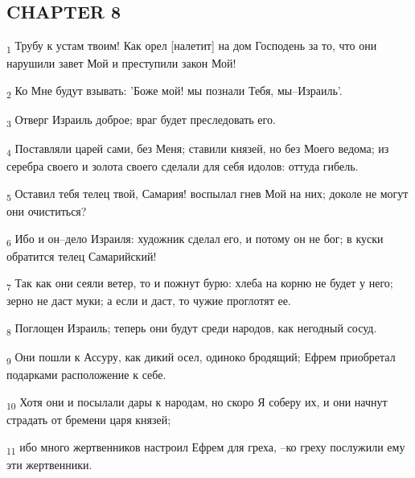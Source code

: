 \subsection{CHAPTER 8}
\begin{tcolorbox}
\textsubscript{1} Трубу к устам твоим! Как орел [налетит] на дом Господень за то, что они нарушили завет Мой и преступили закон Мой!
\end{tcolorbox}
\begin{tcolorbox}
\textsubscript{2} Ко Мне будут взывать: 'Боже мой! мы познали Тебя, мы--Израиль'.
\end{tcolorbox}
\begin{tcolorbox}
\textsubscript{3} Отверг Израиль доброе; враг будет преследовать его.
\end{tcolorbox}
\begin{tcolorbox}
\textsubscript{4} Поставляли царей сами, без Меня; ставили князей, но без Моего ведома; из серебра своего и золота своего сделали для себя идолов: оттуда гибель.
\end{tcolorbox}
\begin{tcolorbox}
\textsubscript{5} Оставил тебя телец твой, Самария! воспылал гнев Мой на них; доколе не могут они очиститься?
\end{tcolorbox}
\begin{tcolorbox}
\textsubscript{6} Ибо и он--дело Израиля: художник сделал его, и потому он не бог; в куски обратится телец Самарийский!
\end{tcolorbox}
\begin{tcolorbox}
\textsubscript{7} Так как они сеяли ветер, то и пожнут бурю: хлеба на корню не будет у него; зерно не даст муки; а если и даст, то чужие проглотят ее.
\end{tcolorbox}
\begin{tcolorbox}
\textsubscript{8} Поглощен Израиль; теперь они будут среди народов, как негодный сосуд.
\end{tcolorbox}
\begin{tcolorbox}
\textsubscript{9} Они пошли к Ассуру, как дикий осел, одиноко бродящий; Ефрем приобретал подарками расположение к себе.
\end{tcolorbox}
\begin{tcolorbox}
\textsubscript{10} Хотя они и посылали дары к народам, но скоро Я соберу их, и они начнут страдать от бремени царя князей;
\end{tcolorbox}
\begin{tcolorbox}
\textsubscript{11} ибо много жертвенников настроил Ефрем для греха, --ко греху послужили ему эти жертвенники.
\end{tcolorbox}

